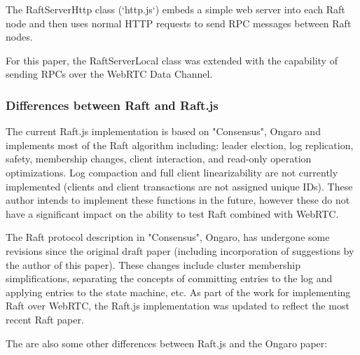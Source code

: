 \documentclass{acmtog} %
\begin{document}
The RaftServerHttp class (`http.js`) embeds a simple web server into
each Raft node and then uses normal HTTP requests to send RPC messages
between Raft nodes.

For this paper, the RaftServerLocal class was extended with the
capability of sending RPCs over the WebRTC Data Channel.

\subsubsection{Differences between Raft and Raft.js}

The current Raft.js implementation is based on "Consensus", Ongaro and
implements most of the Raft algorithm including: leader election, log
replication, safety, membership changes, client interaction, and
read-only operation optimizations. Log compaction and full client
linearizability are not currently implemented (clients and client
transactions are not assigned unique IDs). These author intends to
implement these functions in the future, however these do not have
a significant impact on the ability to test Raft combined with WebRTC.

The Raft protocol description in "Consensus", Ongaro, has undergone
some revisions since the original draft paper (including incorporation
of suggestions by the author of this paper). These changes include
cluster membership simplifications, separating the concepts of
committing entries to the log and applying entries to the state
machine, etc. As part of the work for implementing Raft
over WebRTC, the Raft.js implementation was updated to reflect the
most recent Raft paper.

The are also some other differences between Raft.js and the Ongaro
paper:
\end{document}
